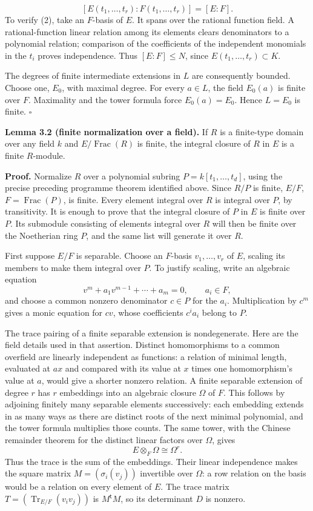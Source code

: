 \documentclass[
]{article}
\begin{document}
\[
[E(t_1,\ldots,t_r):F(t_1,\ldots,t_r)]=[E:F].
\tag{2}
\] To verify (2), take an \(F\)-basis of \(E\). It spans over the
rational function field. A rational-function linear relation among its
elements clears denominators to a polynomial relation; comparison of the
coefficients of the independent monomials in the \(t_i\) proves
independence. Thus \([E:F]\leq N\), since
\(E(t_1,\ldots,t_r)\subset K\).

The degrees of finite intermediate extensions in \(L\) are consequently
bounded. Choose one, \(E_0\), with maximal degree. For every \(a\in L\),
the field \(E_0(a)\) is finite over \(F\). Maximality and the tower
formula force \(E_0(a)=E_0\). Hence \(L=E_0\) is finite. \(\square\)

\protect{}\label{lemma-3-2}{}

\textbf{Lemma 3.2 (finite normalization over a field).} If \(R\) is a
finite-type domain over any field \(k\) and \(E/\operatorname{Frac}(R)\)
is finite, the integral closure of \(R\) in \(E\) is a finite
\(R\)-module.

\textbf{Proof.} Normalize \(R\) over a polynomial subring
\(P=k [t_1,\ldots,t_d]\), using the precise preceding programme theorem
identified above. Since \(R/P\) is finite, \(E/F\),
\(F=\operatorname{Frac}(P)\), is finite. Every element integral over
\(R\) is integral over \(P\), by transitivity. It is enough to prove
that the integral closure of \(P\) in \(E\) is finite over \(P\). Its
submodule consisting of elements integral over \(R\) will then be finite
over the Noetherian ring \(P\), and the same list will generate it over
\(R\).

First suppose \(E/F\) is separable. Choose an \(F\)-basis
\(v_1,\ldots,v_r\) of \(E\), scaling its members to make them integral
over \(P\). To justify scaling, write an algebraic equation \[
v^m+a_1v^{m-1}+\cdots+a_m=0,\qquad a_i\in F,
\] and choose a common nonzero denominator \(c\in P\) for the \(a_i\).
Multiplication by \(c^m\) gives a monic equation for \(cv\), whose
coefficients \(c^i a_i\) belong to \(P\).

The trace pairing of a finite separable extension is nondegenerate. Here
are the field details used in that assertion. Distinct homomorphisms to
a common overfield are linearly independent as functions: a relation of
minimal length, evaluated at \(ax\) and compared with its value at \(x\)
times one homomorphism's value at \(a\), would give a shorter nonzero
relation. A finite separable extension of degree \(r\) has \(r\)
embeddings into an algebraic closure \(\Omega\) of \(F\). This follows
by adjoining finitely many separable elements successively: each
embedding extends in as many ways as there are distinct roots of the
next minimal polynomial, and the tower formula multiplies those counts.
The same tower, with the Chinese remainder theorem for the distinct
linear factors over \(\Omega\), gives \[
E\otimes_F\Omega\cong\Omega^r.
\] Thus the trace is the sum of the embeddings. Their linear
independence makes the square matrix \(M=(\sigma_i(v_j))\) invertible
over \(\Omega\): a row relation on the basis would be a relation on
every element of \(E\). The trace matrix
\(T=(\operatorname{Tr}_{E/F}(v_iv_j))\) is \(M^{\mathsf t}M\), so its
determinant \(D\) is nonzero.
\end{document}
